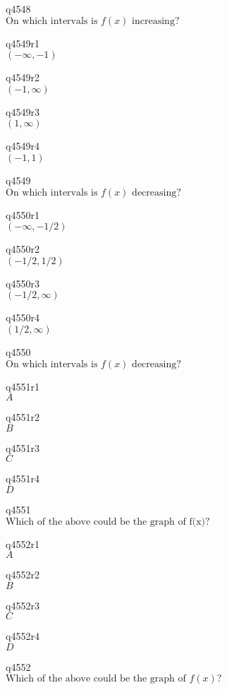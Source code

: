 q4548\\
\(\displaystyle \text{On which intervals is } f(x) \text{ increasing?} \)

q4549r1\\
\(\displaystyle (-\infty, -1) \)

q4549r2\\
\(\displaystyle (-1, \infty) \)

q4549r3\\
\(\displaystyle (1, \infty) \)

q4549r4\\
\(\displaystyle (-1, 1) \)

q4549\\
\(\displaystyle \text{On which intervals is } f(x) \text{ decreasing?} \)

q4550r1\\
\(\displaystyle (-\infty, -1/2) \)

q4550r2\\
\(\displaystyle (-1/2, 1/2) \)

q4550r3\\
\(\displaystyle (-1/2, \infty) \)

q4550r4\\
\(\displaystyle (1/2, \infty) \)

q4550\\
\(\displaystyle \text{On which intervals is } f(x) \text{ decreasing?} \)

q4551r1\\
\(\displaystyle A \)

q4551r2\\
\(\displaystyle B \)

q4551r3\\
\(\displaystyle C \)

q4551r4\\
\(\displaystyle D \)

q4551\\
\(\displaystyle \text{Which of the above could be the graph of f(x)?} \)

q4552r1\\
\(\displaystyle A \)

q4552r2\\
\(\displaystyle B \)

q4552r3\\
\(\displaystyle C \)

q4552r4\\
\(\displaystyle D \)

q4552\\
\(\displaystyle \text{Which of the above could be the graph of } f(x)? \)

